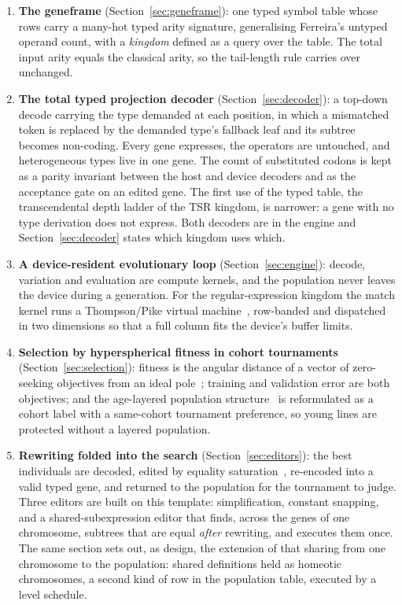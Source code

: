 \documentclass[sigconf,nonacm]{acmart}
\begin{document}
\begin{enumerate}
\item \textbf{The geneframe} (Section~\ref{sec:geneframe}): one typed symbol
table whose rows carry a many-hot typed arity signature, generalising Ferreira's
untyped operand count, with a \emph{kingdom} defined as a query over the table.
The total input arity equals the classical arity, so the tail-length rule
carries over unchanged.
\item \textbf{The total typed projection decoder} (Section~\ref{sec:decoder}): a
top-down decode carrying the type demanded at each position, in which a
mismatched token is replaced by the demanded type's fallback leaf and its subtree
becomes non-coding. Every gene expresses, the operators are untouched, and
heterogeneous types live in one gene. The count of substituted codons is kept as
a parity invariant between the host and device decoders and as the acceptance
gate on an edited gene. The first use of the typed table, the transcendental
depth ladder of the TSR kingdom, is narrower: a gene with no type derivation
does not express. Both decoders are in the engine and Section~\ref{sec:decoder}
states which kingdom uses which.
\item \textbf{A device-resident evolutionary loop} (Section~\ref{sec:engine}):
decode, variation and evaluation are compute kernels, and the population never
leaves the device during a generation. For the regular-expression kingdom the
match kernel runs a Thompson/Pike virtual
machine~\cite{thompson1968regex,cox2007regex,cox2009regexvm}, row-banded and
dispatched in two dimensions so that a full column fits the device's buffer
limits.
\item \textbf{Selection by hyperspherical fitness in cohort tournaments}
(Section~\ref{sec:selection}): fitness is the angular distance of a vector of
zero-seeking objectives from an ideal pole~\cite{morgan2026hff}; training and
validation error are both objectives; and the age-layered population
structure~\cite{hornby2006alps} is reformulated as a cohort label with a
same-cohort tournament preference, so young lines are protected without a
layered population.
\item \textbf{Rewriting folded into the search} (Section~\ref{sec:editors}):
the best individuals are decoded, edited by equality saturation~\cite{tate2009equality,%
willsey2021egg,egglog}, re-encoded into a valid typed gene, and returned to the
population for the tournament to judge. Three editors are built on this
template: simplification, constant snapping, and a shared-subexpression editor
that finds, across the genes of one chromosome, subtrees that are equal
\emph{after} rewriting, and executes them once. The same section sets out, as
design, the extension of that sharing from one chromosome to the population:
shared definitions held as homeotic chromosomes, a second kind of row in the
population table, executed by a level schedule.
\end{enumerate}
\end{document}
